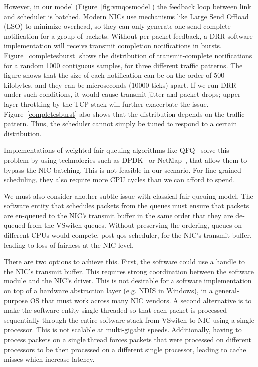 However, in our model  (Figure~\ref{fig:vmqosmodel}) the feedback loop between
link and scheduler is batched.  Modern NICs use mechanisms like Large Send
Offload (LSO) to minimize overhead, so they can only generate one send-complete
notification for a group of packets.  Without per-packet feedback, a DRR
software implementation will receive transmit completion notifications in
bursts. Figure~\ref{completesburst} shows the distribution of transmit-complete
notifications for a random 1000 contiguous samples, for three different traffic patterns.
The figure shows that the size of each notification can be on the order
of 500 kilobytes, and they can be microseconds (10000 ticks) apart. If
we run DRR under such conditions, it would cause transmit
jitter and packet drops; upper-layer throttling by the TCP
stack will further exacerbate the issue.  Figure~\ref{completesburst} also shows that 
the distribution depends on the traffic pattern. Thus, the scheduler cannot
simply be tuned to respond to a certain distribution.

Implementations of weighted fair queuing algorithms like QFQ~\cite{qfq} solve
this problem by using technologies such as DPDK~\cite{dpdk} or
NetMap~\cite{netmap}, that allow them to bypass the NIC batching.  This is not
feasible in our scenario. For fine-grained scheduling, they also require more
CPU cycles than we can afford to spend.

We must also consider another subtle issue with classical fair queuing model.  
The software entity that schedules packets from the queues must ensure that 
packets are en-queued to the NIC's transmit buffer in the same order that they 
are de-queued from the VSwitch queues.  Without preserving the ordering,
queues on different CPUs would compete, post qos-scheduler, for the NIC's
transmit buffer, leading to loss of fairness at the NIC level.

There are two options to achieve this. First, the software could use a handle to
the NIC's transmit buffer.  This requires strong coordination between the
software module and the NIC's driver.  This is not desirable for a software
implementation on top of a hardware abstraction layer (e.g. NDIS in Windows), 
in a general-purpose OS that must work across many NIC vendors. A second
alternative is to make the software entity single-threaded so that each packet
is processed sequentially through the entire software stack from VSwitch to NIC
using a single processor. This is not scalable at multi-gigabit speeds.
Additionally, having to process packets on a single thread forces packets that
were processed on different processors to be then processed on a different
single processor, leading to cache misses which increase latency.  

